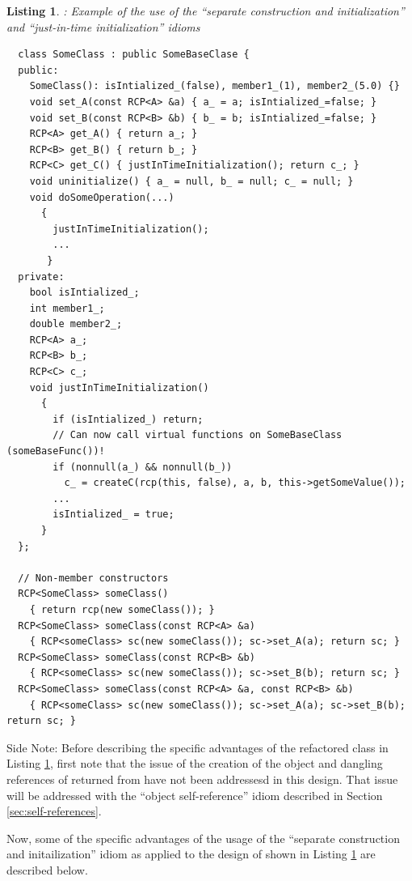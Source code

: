 \documentclass[pdf,ps2pdf,11pt]{SANDreport}
\newtheorem{listing}{Listing}
\begin{document}
\begin{listing}: Example of the use of the ``separate construction and
initialization'' and ``just-in-time initialization'' idioms  \\
\label{listing:sci:SomeClass-refactored}
{\small\begin{verbatim}
  class SomeClass : public SomeBaseClase {
  public:
    SomeClass(): isIntialized_(false), member1_(1), member2_(5.0) {}
    void set_A(const RCP<A> &a) { a_ = a; isIntialized_=false; }
    void set_B(const RCP<B> &b) { b_ = b; isIntialized_=false; }
    RCP<A> get_A() { return a_; }
    RCP<B> get_B() { return b_; }
    RCP<C> get_C() { justInTimeInitialization(); return c_; }
    void uninitialize() { a_ = null, b_ = null; c_ = null; }
    void doSomeOperation(...)
      {
        justInTimeInitialization();
        ...
       }
  private:
    bool isIntialized_;
    int member1_;
    double member2_;
    RCP<A> a_;
    RCP<B> b_;
    RCP<C> c_;
    void justInTimeInitialization()
      {
        if (isIntialized_) return;
        // Can now call virtual functions on SomeBaseClass (someBaseFunc())!
        if (nonnull(a_) && nonnull(b_))
          c_ = createC(rcp(this, false), a, b, this->getSomeValue());
        ...
        isIntialized_ = true;
      }
  };

  // Non-member constructors
  RCP<SomeClass> someClass()
    { return rcp(new someClass()); }
  RCP<SomeClass> someClass(const RCP<A> &a)
    { RCP<someClass> sc(new someClass()); sc->set_A(a); return sc; }
  RCP<SomeClass> someClass(const RCP<B> &b)
    { RCP<someClass> sc(new someClass()); sc->set_B(b); return sc; }
  RCP<SomeClass> someClass(const RCP<A> &a, const RCP<B> &b)
    { RCP<someClass> sc(new someClass()); sc->set_A(a); sc->set_B(b);  return sc; }
\end{verbatim}}
\end{listing}


Side Note: Before describing the specific advantages of the refactored
class in Listing {}\ref{listing:sci:SomeClass-refactored}, first
note that the issue of the creation of the {} object and
dangling references of {} returned from
{} have not been addressesd in this design.  That
issue will be addressed with the ``object self-reference'' idiom
described in Section {}\ref{sec:self-references}.

Now, some of the specific advantages of the usage of the ``separate
construction and initailization'' idiom as applied to the design of
{} shown in Listing
{}\ref{listing:sci:SomeClass-refactored} are described below.
\end{document}
